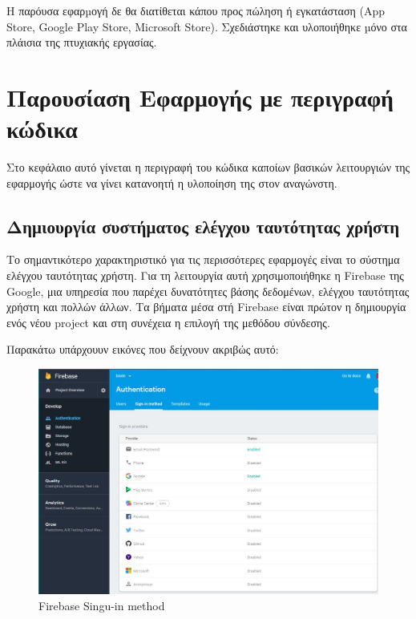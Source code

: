\documentclass[a4paper,12pt]{article}
\begin{document}
		Η παρόυσα εφαρµογή δε θα διατίθεται κάπου προς πώληση ή εγκατάσταση (App Store, Google Play Store, Microsoft Store).
		Σχεδιάστηκε και υλοποιήθηκε µόνο στα πλάισια της πτυχιακής εργασίας. 
		\newpage
		\section{Παρουσίαση Εφαρμογής με περιγραφή κώδικα}
			Στο κεφάλαιο αυτό γίνεται η περιγραφή του κώδικα καποίων βασικών λειτουργιών της εφαρμογής ώστε να γίνει κατανοητή η υλοποίηση της στον αναγώνστη.
			\subsection{Δημιουργία συστήματος ελέγχου ταυτότητας χρήστη}

				Το σημαντικότερο χαρακτηριστικό για τις περισσότερες εφαρμογές είναι το σύστημα ελέγχου ταυτότητας χρήστη. Για τη λειτουργία αυτή χρησιμοποιήθηκε 
				η Firebase της Google, μια υπηρεσία που παρέχει δυνατότητες βάσης δεδομένων, ελέγχου ταυτότητας χρήστη και πολλών άλλων. 
				Τα βήματα μέσα στή Firebase είναι πρώτον η δημιουργία ενός νέου project και στη συνέχεια η επιλογή της μεθόδου σύνδεσης.
				
				Παρακάτω υπάρχουυν εικόνες που δείχνουν ακριβώς αυτό:

				\vspace*{1cm}

			\begin{figure}[!htb]
				\begin{center}
					\caption{Firebase Singu-in method}
					\vspace*{0.5cm}

					\includegraphics[width=0.9\linewidth]{auth} 
				\end{center}
			\end{figure}
\end{document}
